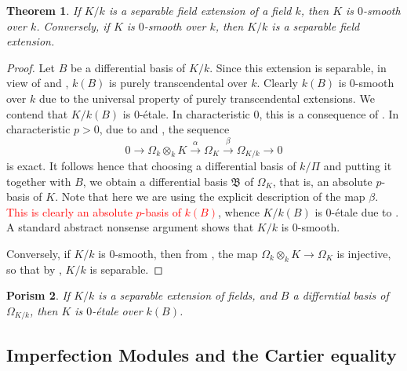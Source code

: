 \documentclass[10pt]{article}
\theoremstyle{thmstyle}
\newtheorem{theorem}{Theorem}[section]
\theoremstyle{defstyle}
\newtheorem{porism}[theorem]{Porism}
\newcommand{\frakB}{\mathfrak{B}}
\begin{document}
\begin{theorem}
    If $K/k$ is a separable field extension of a field $k$, then $K$ is $0$-smooth over $k$. Conversely, if $K$ is $0$-smooth over $k$, then $K/k$ is a separable field extension.
\end{theorem}
\begin{proof}
    Let $B$ be a differential basis of $K/k$. Since this extension is separable, in view of  and , $k(B)$ is purely transcendental over $k$. Clearly $k(B)$ is $0$-smooth over $k$ due to the universal property of purely transcendental extensions. We contend that $K/k(B)$ is $0$-\'etale. In characteristic $0$, this is a consequence of . In characteristic $p > 0$, due to  and , the sequence 
    \begin{equation*}
        0\to \Omega_k\otimes_k K\xrightarrow{\alpha} \Omega_K\xrightarrow{\beta}\Omega_{K/k}\to 0
    \end{equation*}
    is exact. It follows hence that choosing a differential basis of $k/\Pi$ and putting it together with $B$, we obtain a differential basis $\frakB$ of $\Omega_K$, that is, an absolute $p$-basis of $K$. Note that here we are using the explicit description of the map $\beta$. \textcolor{red}{This is clearly an absolute $p$-basis of $k(B)$}, whence $K/k(B)$ is $0$-\'etale due to . A standard abstract nonsense argument shows that $K/k$ is $0$-smooth.

    Conversely, if $K/k$ is $0$-smooth, then from , the map $\Omega_k\otimes_k K\to\Omega_K$ is injective, so that by , $K/k$ is separable.
\end{proof}

\begin{porism}
    If $K/k$ is a separable extension of fields, and $B$ a differntial basis of $\Omega_{K/k}$, then $K$ is $0$-\'etale over $k(B)$.
\end{porism}

\subsection{Imperfection Modules and the Cartier equality}
\end{document}
